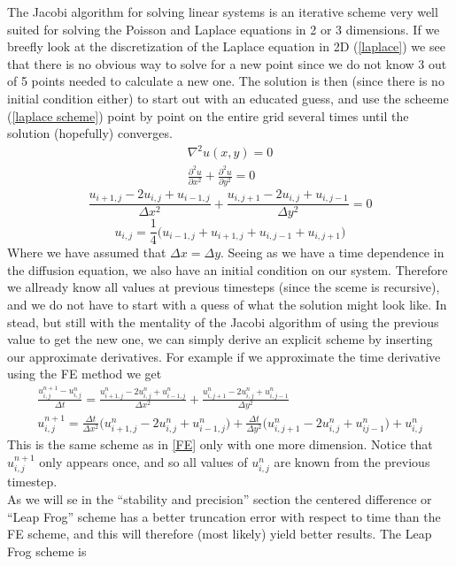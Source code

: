 \documentclass[a4paper,english, 10pt, twoside]{article}
\begin{document}
The Jacobi algorithm for solving linear systems is an iterative scheme very well suited for solving the Poisson and Laplace 
equations in 2 or 3 dimensions. If we breefly look at the discretization of the Laplace equation in 2D (\ref{laplace}) we see that 
there is no obvious way to solve for a new point since we do not know 3 out of 5 points needed to calculate a new one. The solution 
is then (since there is no initial condition either) to start out with an educated guess, and use the scheeme (\ref{laplace scheme}) 
point by point on the entire grid several times until the solution (hopefully) converges.
\begin{align*}
 \nabla^2u(x,y) = 0\\
 \frac{\partial^2 u}{\partial x^2} +  \frac{\partial^2 u}{\partial y^2} = 0 
\end{align*}
\begin{equation}\label{laplace}
 \frac{u_{i+1,j}-2u_{i,j}+u_{i-1,j}}{\Delta x^2} +  \frac{u_{i,j+1}-2u_{i,j}+u_{i,j-1}}{\Delta y^2} = 0
\end{equation}
\begin{equation}\label{laplace scheme}
u_{i,j} = \frac{1}{4}\Big(u_{i-1,j}+u_{i+1,j}+u_{i,j-1}+u_{i,j+1}\Big) 
\end{equation}
Where we have assumed that $\Delta x = \Delta y$. Seeing as we have a time dependence in the diffusion equation, we also have an initial 
condition on our 
system. Therefore we allready know all values at previous timesteps (since the sceme is recursive), and we do not have to start 
with a quess of what the solution might look like. In stead, but still with the mentality of the Jacobi algorithm of using the 
previous value to get the new one, we can simply derive an explicit scheme by inserting our approximate derivatives. For example 
if we approximate the time derivative using the FE method we get
\begin{align*}
 \frac{u^{n+1}_{i,j}-u^n_{i,j}}{\Delta t} = \frac{u^n_{i+1,j}-2u^n_{i,j} + u^n_{i-1,j}}{\Delta x^2}+ 
 \frac{u^n_{i,j+1}-2u^n_{i,j} + u^n_{i,j-1}}{\Delta y^2} \\
 u^{n+1}_{i,j} = \frac{\Delta t}{\Delta x^2}\big(u^n_{i+1,j}-2u^n_{i,j} + u^n_{i-1,j}\big) + 
 \frac{\Delta t}{\Delta y^2}\big(u^n_{i,j+1}-2u^n_{i,j} + u^n_{ij-1}\big) + u^n_{i,j}
\end{align*}
This is the same scheme as in \ref{FE} only with one more dimension. Notice that $u^{n+1}_{i,j}$ only appears once, and so all values of 
$u^n_{i,j}$ are known from the previous timestep. \\
As we will se in the ``stability and precision'' section 
the centered difference or ``Leap Frog'' scheme has a better truncation error with respect to time than the FE scheme, and this 
will therefore (most likely) yield better results. The Leap Frog scheme is
\end{document}
